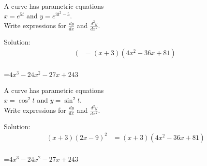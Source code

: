 \clearpage\noindent%
\begin{mtask}[resume]
   \task \begin{exercise} A curve has parametric equations\\
                                  $x=e^{5t} $ and $y=e^{3t^2-5}$.\\
                          Write expressions for $\frac{dy}{dx}$ and $\frac{d^2y}{dx^2}. $        %
              \begin{envSolution}[height=12cm]
			      Solution:
			      \begin{align*}
			        ( &= (x+3)(4x^2-36x+81)                      \\[10pt]    
				 \end{align*}
                 \begin{shortsolution}  
				       =$4x^3-24x^2-27x+243$
			     \end{shortsolution}				 
               \end{envSolution}
         \end{exercise}
\end{mtask}

\clearpage\noindent%
\begin{mtask}[resume]
   \task \begin{exercise} A curve has parametric equations\\
                                  $x=\cos^2 t $ and $y=\sin^2 t$.\\
                          Write expressions for $\frac{dy}{dx}$ and $\frac{d^2y}{dx^2}. $        %
              \begin{envSolution}[height=12cm]
			      Solution:
			      \begin{align*}
			        (x+3)(2x-9)^2  &= (x+3)(4x^2-36x+81)                      \\[10pt]    
				 \end{align*}
                 \begin{shortsolution}  
				       =$4x^3-24x^2-27x+243$
			     \end{shortsolution}				 
               \end{envSolution}
         \end{exercise}


\end{mtask}
